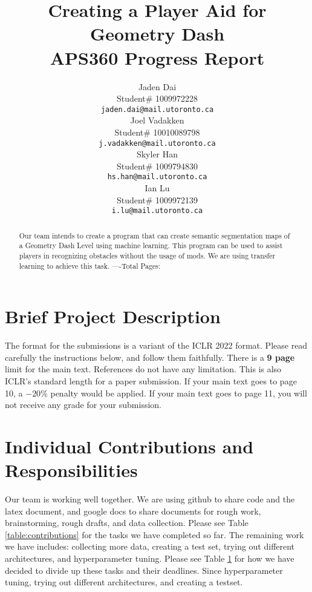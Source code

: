 \documentclass{article} %
\title{Creating a Player Aid for Geometry Dash  \\ 
APS360 Progress Report}
\author{Jaden Dai \\
Student\# 1009972228\\
\texttt{jaden.dai@mail.utoronto.ca} \\
\And
Joel Vadakken  \\
Student\# 10010089798\\
\texttt{j.vadakken@mail.utoronto.ca} \\
\And
Skyler Han  \\
Student\# 1009794830 \\
\texttt{hs.han@mail.utoronto.ca} \\
\AND
Ian Lu  \\
Student\# 1009972139 \\
\texttt{i.lu@mail.utoronto.ca} \\
\AND
}
\begin{document}
\maketitle

\begin{abstract}
Our team intends to create a program that can create semantic segmentation
maps of a Geometry Dash Level using machine learning. This program can be
used to assist players in recognizing obstacles without the usage of mods.
We are using transfer learning to achieve this task.
----Total Pages: \pageref{last_page}
\end{abstract}



\section{Brief Project Description}


The format for the submissions is a variant of the ICLR 2022 format.
Please read carefully the instructions below, and follow them
faithfully. There is a \textbf{9 page} limit for the main text. References do not have any limitation. This is also ICLR's standard length for a paper submission. 
If your main text goes to page 10, a $-20\%$ penalty would be applied. If your main text goes to page 11, you will not receive any grade for your submission. 
 

\section{Individual Contributions and Responsibilities}
\label{gen_inst}

Our team is working well together. We are using github to share code and the latex document, and google docs to share documents for rough work, brainstorming, rough drafts, and data collection. Please see Table \ref{table:contributions} for the tasks we have completed so far. The remaining work we have includes: collecting more data, creating a test set, trying out different architectures, and hyperparameter tuning.  Please see Table \ref{} for how we have decided to divide up these tasks and their deadlines. Since hyperparameter tuning, trying out different architectures, and creating a testset. 
\end{document}
